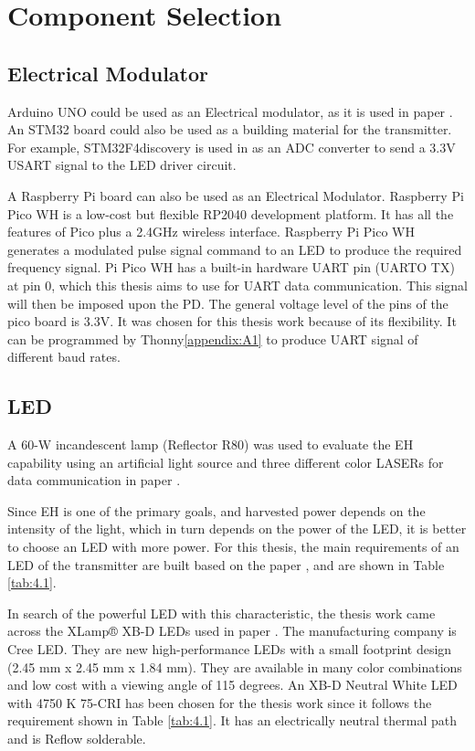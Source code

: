 \section{Component Selection}

\subsection{Electrical Modulator}

Arduino UNO could be used as an Electrical modulator, as it is used in paper \cite{mahmoud2022design}. An STM32 board could also be used as a building material for the transmitter. For example, STM32F4discovery is used in \cite{7420990} as an ADC converter to send a 3.3V \ac{USART} signal to the LED driver circuit.

A Raspberry Pi board can also be used as an Electrical Modulator. Raspberry Pi Pico WH is a low-cost but flexible RP2040 development platform. It has all the features of Pico plus a 2.4GHz wireless interface. Raspberry Pi Pico WH generates a modulated pulse signal command to an LED to produce the required frequency signal. Pi Pico WH has a built-in hardware \ac{UART} pin (UARTO TX) at pin 0, which this thesis aims to use for \ac{UART} data communication. This signal will then be imposed upon the \ac{PD}. The general voltage level of the pins of the pico board is 3.3V. It was chosen for this thesis work because of its flexibility. It can be programmed by Thonny\ref{appendix:A1} to produce \ac{UART} signal of different baud rates. 


\subsection{LED}

A 60-W incandescent lamp (Reflector R80) was used to evaluate the \ac{EH} capability using an artificial light source and three different color LASERs for data communication in paper \cite{de2024reconfigurable}.

Since \ac{EH} is one of the primary goals, and harvested power depends on the intensity of the light, which in turn depends on the power of the LED, it is better to choose an LED with more power. For this thesis, the main requirements of an LED of the transmitter are built based on the paper \cite{mahmoud2022design}, and are shown in Table \ref{tab:4.1}.

In search of the powerful LED with this characteristic, the thesis work came across the XLamp® XB-D LEDs used in paper \cite{7292748}. The manufacturing company is Cree LED. They are new high-performance LEDs with a small footprint design (2.45 mm x 2.45 mm x 1.84 mm). They are available in many color combinations and low cost \cite{productfamily} with a viewing angle of 115 degrees. 
An XB-D Neutral White LED with 4750 K 75-CRI has been chosen for the thesis work since it follows the requirement shown in Table \ref{tab:4.1}. It has an electrically neutral thermal path and is Reflow solderable.

